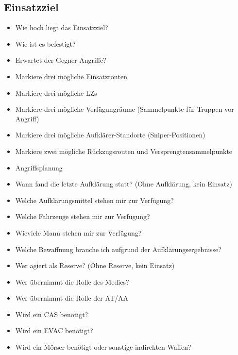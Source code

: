 \subsection{Einsatzziel}
	\begin{itemize}
		\item 	Wie hoch liegt das Einsatzziel?
		\item 	Wie ist es befestigt?
		\item 	Erwartet der Gegner Angriffe?
		\item 	Markiere drei mögliche Einsatzrouten
		\item 	Markiere drei mögliche LZs
		\item 	Markiere drei mögliche Verfügungräume (Sammelpunkte für Truppen vor Angriff)
		\item 	Markiere drei mögliche Aufklärer-Standorte (Sniper-Positionen)
		\item 	Markiere zwei mögliche Rückzugsrouten und Versprengtensammelpunkte
		\item 	Angriffsplanung
		\item 	Wann fand die letzte Aufklärung statt? (Ohne Aufklärung, kein Einsatz)
		\item 	Welche Aufklärungsmittel stehen mir zur Verfügung?
		\item 	Welche Fahrzeuge stehen mir zur Verfügung?
		\item 	Wieviele Mann stehen mir zur Verfügung?
		\item 	Welche Bewaffnung brauche ich aufgrund der Aufklärungsergebnisse?
		\item 	Wer agiert als Reserve? (Ohne Reserve, kein Einsatz)
		\item 	Wer übernimmt die Rolle des Medics?
		\item 	Wer übernimmt die Rolle der AT/AA
		\item 	Wird ein CAS benötigt?
		\item 	Wird ein EVAC benötigt?
		\item 	Wird ein Mörser benötigt oder sonstige indirekten Waffen?
	\end{itemize}

